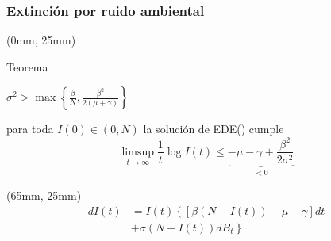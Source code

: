 \begin{frame}
    \frametitle{Extinción por ruido ambiental}
        \begin{textblock*}{65mm}(0mm, 25mm)
            \begin{yellowbox}{Teorema}
                \begin{list}{\bullet}{}
                    \item
                        $
                            \displaystyle
                            \sigma ^ 2 
                            >
                            \max
                            \left\{
                                \frac{\beta}{N},
                                \frac{\beta^2}{2(\mu + \gamma)}
                            \right\}
                        $
                \end{list}
                \tcblower
                para toda $I(0)\in (0, N)$ la solución de EDE(\star)
                cumple
                $$
                    \limsup_{t \to \infty} 
                        \frac{1}{t} \log I(t)
                        \leq
                        \underbrace{
                        -\mu - \gamma 
                        + \frac{\beta^2}{2 \sigma ^ 2}
                        }_{<0}
                $$
            \end{yellowbox}
        \end{textblock*}
        \begin{textblock*}{60mm}(65mm, 25mm)
            \begin{align*}
                dI(t) &= 
                    I(t)
                    \left\{
                        [
                            \beta (N - I(t))
                            -\mu - \gamma
                        ]
                        dt
                    \right.
                    \\
                     &+
                    \left.
                        \sigma (N-I(t))
                        dB_t
                    \right\}
                    \tag{\star}
            \end{align*}
        \end{textblock*}
\end{frame}